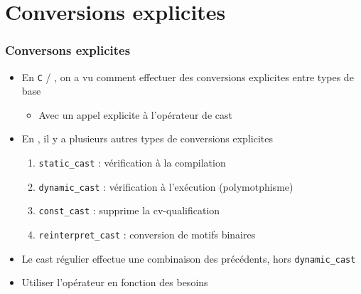 \section{Conversions explicites}

\begin{frame}
\frametitle{Conversons explicites}
\begin{itemize}[<+->]
\item En \texttt{C} / \cpp, on a vu comment effectuer des conversions explicites entre types de base
	\begin{itemize}
	\item Avec un appel explicite à l'opérateur de cast
	\end{itemize}
\item En \cpp, il y a plusieurs autres types de conversions explicites
	\begin{enumerate}
	\item \lstinline|static_cast| : vérification à la compilation
	\item \lstinline|dynamic_cast| : vérification à l'exécution (polymotphisme) 
	\item \lstinline|const_cast| : supprime la cv-qualification
	\item \lstinline|reinterpret_cast| : conversion de motifs binaires
	\end{enumerate}
\item Le cast régulier effectue une combinaison des précédents, hors \lstinline|dynamic_cast|
\item Utiliser l'opérateur en fonction des besoins
\end{itemize}
\end{frame}

